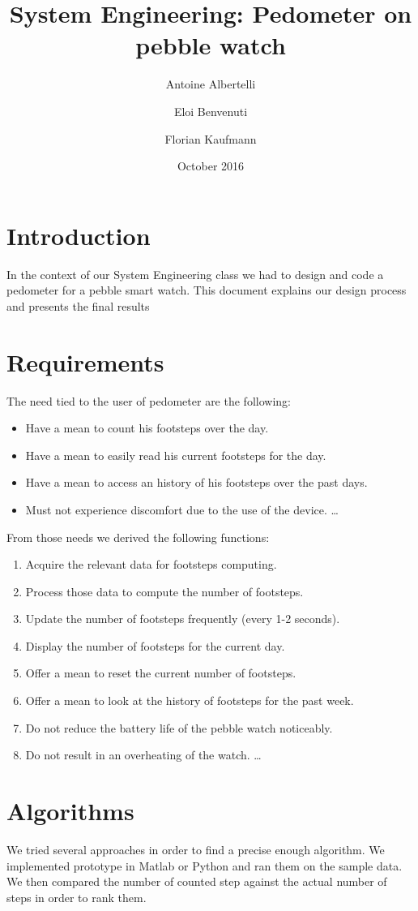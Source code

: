 \documentclass[12pt,twoside,a4paper]{article}
\title{System Engineering: Pedometer on pebble watch}
\author{Antoine Albertelli \and Eloi Benvenuti \and Florian Kaufmann}
\date{October 2016}
\begin{document}
\maketitle

\tableofcontents

\newpage

\section{Introduction}
In the context of our System Engineering class we had to design and code a pedometer for a pebble smart	watch. This document explains our design process and presents the final results
\section{Requirements}
The need tied to the user of pedometer are the following:
\begin{itemize}
	\item Have a mean to count his footsteps over the day.
	\item Have a mean to easily read his current footsteps for the day.
	\item Have a mean to access an history of his footsteps over the past days.
	\item Must not experience discomfort due to the use of the device.  \ldots
\end{itemize}

From those needs we derived the following functions:
\begin{enumerate}
	\item Acquire the relevant data for footsteps computing.
	\item Process those data to compute the number of footsteps.
	\item Update the number of footsteps frequently (every 1-2 seconds).
	\item Display the number of footsteps for the current day.
	\item Offer a mean to reset the current number of footsteps.
	\item Offer a mean to look at the history of footsteps for the past week.
	\item Do not reduce the battery life of the pebble watch noticeably.
	\item Do not result in an overheating of the watch. \ldots
\end{enumerate}

\section{Algorithms}
We tried several approaches in order to find a precise enough algorithm.
We implemented prototype in Matlab or Python and ran them on the sample data.
We then compared the number of counted step against the actual number of steps in order to rank them.
\end{document}
